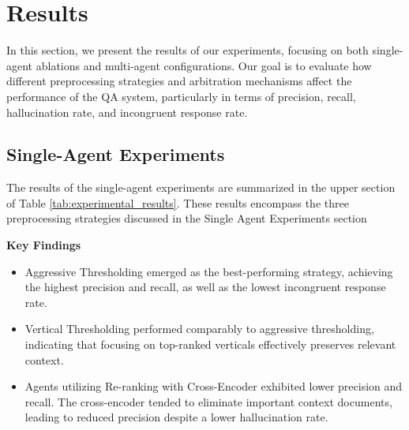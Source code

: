 \documentclass[sigconf,nonacm]{acmart}
\begin{document}
\section{Results}
In this section, we present the results of our experiments, focusing on both single-agent ablations and multi-agent configurations. Our goal is to evaluate how different preprocessing strategies and arbitration mechanisms affect the performance of the QA system, particularly in terms of precision, recall, hallucination rate, and incongruent response rate.


\subsection{Single-Agent Experiments}
The results of the single-agent experiments are summarized in the upper section of Table \ref{tab:experimental_results}.  These results encompass the three preprocessing strategies discussed in the Single Agent Experiments section

\textbf{Key Findings}
\begin{itemize}
\item Aggressive Thresholding emerged as the best-performing strategy, achieving the highest precision and recall, as well as the lowest incongruent response rate.
\item Vertical Thresholding performed comparably to aggressive thresholding, indicating that focusing on top-ranked verticals effectively preserves relevant context.
\item Agents utilizing Re-ranking with Cross-Encoder exhibited lower precision and recall. The cross-encoder tended to eliminate important context documents, leading to reduced precision despite a lower hallucination rate.
\end{itemize}
\end{document}
